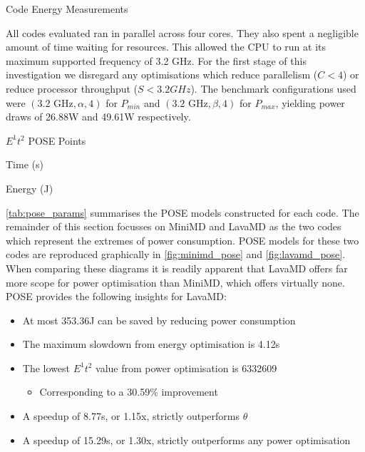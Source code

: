 \begin{table}
\centering
\caption{Code Energy Measurements}
\label{tab:code_metrics}

\end{table}

All codes evaluated ran in parallel across four cores.
They also spent a negligible amount of time waiting for resources. 
This allowed the CPU to run at its maximum supported frequency of 3.2 GHz.
For the first stage of this investigation we disregard any optimisations which reduce parallelism ($C < 4$) or reduce processor throughput ($S < 3.2GHz$).
The benchmark configurations used were $(\text{3.2 GHz}, \alpha, 4)$ for $P_{min}$ and $(\text{3.2 GHz}, \beta, 4)$ for $P_{max}$, yielding power draws of 26.88W and 49.61W respectively.

\begin{table}
  \setlength{\tabcolsep}{.5em}
  \caption{$E^1t^2$ POSE Points}
  \begin{subtable}{\textwidth}
  \centering
  \caption{Time (s)}
  
  \end{subtable}
  \begin{subtable}{\textwidth}
  \centering
  \caption{Energy (J)}
  
  \end{subtable}
  \label{tab:pose_params}
\end{table}

\autoref{tab:pose_params} summarises the POSE models constructed for each code.
The remainder of this section focusses on MiniMD and LavaMD as the two codes which represent the extremes of power consumption.
POSE models for these two codes are reproduced graphically in \autoref{fig:minimd_pose} and \autoref{fig:lavamd_pose}.
When comparing these diagrams it is readily apparent that LavaMD offers far more scope for power optimisation than MiniMD, which offers virtually none. 
POSE provides the following insights for LavaMD:
\begin{itemize}
  \item At most 353.36J can be saved by reducing power consumption
  \item The maximum slowdown from energy optimisation is 4.12s
  \item The lowest $E^1t^2$ value from power optimisation is 6332609
  \begin{itemize}
  \item Corresponding to a 30.59\% improvement
  \end{itemize}
  \item A speedup of 8.77s, or 1.15x, strictly outperforms $\theta$
  \item A speedup of 15.29s, or 1.30x, strictly outperforms any power optimisation
\end{itemize}

